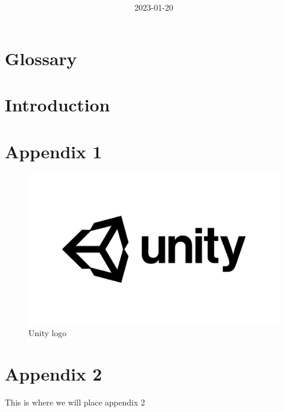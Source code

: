 \documentclass[titlepage]{article}
\title{%
    \Huge \project
}
\date{2023-01-20}
\begin{document}
\maketitle
\newpage

\tableofcontents
\thispagestyle{plain}
\newpage

\section*{Glossary}
    
\thispagestyle{plain}
\newpage

\section{Introduction}
    





\appendix
    \section{Appendix 1}
        \begin{figure}[H]
        \centering
        \includegraphics[scale=0.2]{appendix/Unity.jpg}
        \caption{Unity logo}
        \label{fig:unity}
    \end{figure}

    \section{Appendix 2}
        This is where we will place appendix 2
\end{document}
